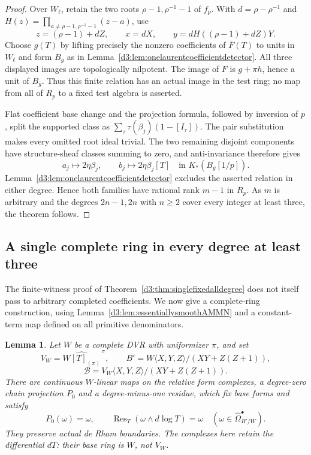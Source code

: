 \documentclass[11pt,a4paper]{amsart}
\numberwithin{equation}{section}
\newtheorem{lemma}[theorem]{Lemma}
\theoremstyle{definition}
\theoremstyle{remark}
\begin{document}
\begin{proof}
Over $W_\ell$, retain the two roots
$\rho-1,\rho^{-1}-1$ of $f_p$.
With $d=\rho-\rho^{-1}$ and
$H(z)=\prod_{a\ne\rho-1,\rho^{-1}-1}(z-a)$, use
\[
 z=(\rho-1)+dZ,\qquad x=dX,\qquad
 y=dH((\rho-1)+dZ)Y.
\]
Choose $g(T)$ by lifting precisely the nonzero coefficients of
$\bar F(T)$ to units in $W_\ell$ and form $B_g$ as in
Lemma~\ref{d3:lem:onelaurentcoefficientdetector}.
All three displayed images are topologically nilpotent.
The image of $F$ is $g+\pi h$, hence a unit of $B_g$.
Thus this finite relation has an actual image in the test ring;
no map from all of $R_p$ to a fixed test algebra is asserted.

Flat coefficient base change and the projection formula, followed
by inversion of $p$, split the supported class as
$\sum_\tau\tau(\beta_j)(1-[I_\tau])$.
The pair substitution makes every omitted root ideal trivial.
The two remaining disjoint components have structure-sheaf
classes summing to zero, and anti-invariance therefore gives
\[
 a_j\longmapsto2\eta\beta_j,\qquad
 b_j\longmapsto2\eta\beta_j[T]
 \quad\text{in }K_*(B_g[1/p]).
\]
Lemma~\ref{d3:lem:onelaurentcoefficientdetector} excludes the asserted
relation in either degree.
Hence both families have rational rank $m-1$ in $R_p$.
As $m$ is arbitrary and the degrees $2n-1,2n$ with $n\geq2$
cover every integer at least three, the theorem follows.
\end{proof}


\subsection{A single complete ring in every degree at least three}
\label{d3:sec:completedfixedalldegree}

The finite-witness proof of Theorem~\ref{d3:thm:singlefixedalldegree}
does not itself pass to arbitrary completed coefficients.  We now
give a complete-ring construction, using
Lemma~\ref{d3:lem:essentiallysmoothAMMN} and a constant-term map
defined on all primitive denominators.

\begin{lemma}
\label{d3:lem:completedcoefficientresidue}
Let $W$ be a complete DVR with uniformizer $\pi$, and set
\[
 V_W=\widehat{W[T]_{(\pi)}}^{\,\pi},\qquad
 B'=W\langle X,Y,Z\rangle/(XY+Z(Z+1)),
\]
\[
 \mathcal B=V_W\langle X,Y,Z\rangle/(XY+Z(Z+1)).
\]
There are continuous $W$-linear maps on the relative form complexes,
a degree-zero chain projection $P_0$ and a degree-minus-one residue,
which fix base forms and satisfy
\[
 P_0(\omega)=\omega,\qquad
 \operatorname{Res}_T(\omega\wedge d\log T)=\omega
 \quad(\omega\in\widehat\Omega^\bullet_{B'/W}).
\]
They preserve actual de Rham boundaries. The complexes here retain
the differential $dT$: their base ring is $W$, not $V_W$.
\end{lemma}
\end{document}
